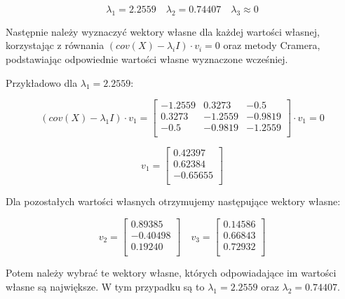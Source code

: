 \documentclass{article}
\begin{document}
\begin{equation*}
    \lambda_1 = 2.2559 \quad \lambda_2 = 0.74407 \quad \lambda_3 \approx 0
\end{equation*}

Następnie należy wyznaczyć wektory własne dla każdej wartości własnej,
korzystając z równania $(cov(X) - \lambda_i I) \cdot v_i = 0$
oraz metody Cramera, podstawiając
odpowiednie wartości własne wyznaczone wcześniej.

Przykładowo dla $\lambda_1 = 2.2559$:

\begin{equation*}
    (cov(X) - \lambda_1 I) \cdot v_1 = 
    \begin{bmatrix}
        -1.2559 & 0.3273 & -0.5 \\
        0.3273 & -1.2559 & -0.9819 \\
        -0.5 & -0.9819 & -1.2559 \\
    \end{bmatrix} \cdot v_1 = 0
\end{equation*}

\begin{equation*}
    v_1 = 
    \begin{bmatrix}
        0.42397 \\
        0.62384 \\
        -0.65655 \\
    \end{bmatrix}
\end{equation*}

Dla pozostałych wartości własnych otrzymujemy następujące wektory własne:

\begin{equation*}
    v_2 = 
    \begin{bmatrix}
        0.89385 \\
        -0.40498 \\
        0.19240 \\
    \end{bmatrix}
    \quad
    v_3 = 
    \begin{bmatrix}
        0.14586 \\
        0.66843 \\
        0.72932 \\
    \end{bmatrix}
\end{equation*}

Potem należy wybrać te wektory własne, których odpowiadające im wartości własne
są największe. W tym przypadku są to $\lambda_1 = 2.2559$ oraz $\lambda_2 = 0.74407$.
\end{document}
